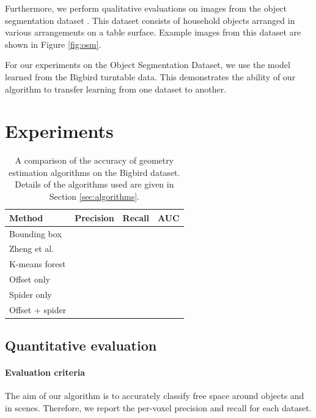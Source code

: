 \documentclass[10pt,twocolumn,letterpaper]{article}
\makeatletter
\newcommand*{\ea}{et al.\@\xspace}
\makeatother
\begin{document}
Furthermore, we perform qualitative evaluations on images from the object segmentation dataset \cite{richtsfeld-iros-2012}.
This dataset consists of household objects arranged in various arrangements on a table surface.
Example images from this dataset are shown in Figure \ref{fig:osm}.

For our experiments on the Object Segmentation Dataset, we use the model learned from the Bigbird turntable data.
This demonstrates the ability of our algorithm to transfer learning from one dataset to another.





\section{Experiments}

\begin{table}
  \centering
  \begin{tabular}{p{2.6cm}lll}
  \toprule
  \textbf{Method}  &   \textbf{Precision} & \textbf{Recall} & \textbf{AUC} \\
  \midrule
  Bounding box &  &  &  \\
  Zheng \ea \cite{zheng-cvpr-2013} &  &  &  \\
  K-means forest &  &  &  \\
  Offset only &  &  &  \\
  Spider only &  &  &  \\
  Offset + spider &  &  &  \\
  \bottomrule
  \end{tabular}
  \vspace{5pt}
  \caption{A comparison of the accuracy of geometry estimation algorithms on the Bigbird dataset. Details of the algorithms used are given in Section \ref{sec:algorithms}.}
    \label{tab:features_used}
\end{table}


\subsection{Quantitative evaluation}

\paragraph{Evaluation criteria}
The aim of our algorithm is to accurately classify free space around objects and in scenes.
Therefore, we report the per-voxel precision and recall for each dataset.
\end{document}
